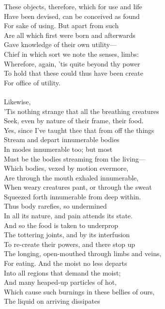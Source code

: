 These objects, therefore, which for use and life\\
Have been devised, can be conceived as found\\
For sake of using. But apart from such\\
Are all which first were born and afterwards\\
Gave knowledge of their own utility—\\
Chief in which sort we note the senses, limbs:\\
Wherefore, again, 'tis quite beyond thy power\\
To hold that these could thus have been create\\
For office of utility.\\
\\
Likewise,\\
'Tis nothing strange that all the breathing creatures\\
Seek, even by nature of their frame, their food.\\
Yes, since I've taught thee that from off the things\\
Stream and depart innumerable bodies\\
In modes innumerable too; but most\\
Must be the bodies streaming from the living—\\
Which bodies, vexed by motion evermore,\\
Are through the mouth exhaled innumerable,\\
When weary creatures pant, or through the sweat\\
Squeezed forth innumerable from deep within.\\
Thus body rarefies, so undermined\\
In all its nature, and pain attends its state.\\
And so the food is taken to underprop\\
The tottering joints, and by its interfusion\\
To re-create their powers, and there stop up\\
The longing, open-mouthed through limbs and veins,\\
For eating. And the moist no less departs\\
Into all regions that demand the moist;\\
And many heaped-up particles of hot,\\
Which cause such burnings in these bellies of ours,\\
The liquid on arriving dissipates\\
